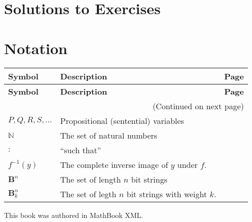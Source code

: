 \documentclass[10pt,]{book}
\theoremstyle{plain}
\theoremstyle{definition}
\theoremstyle{definition}
\theoremstyle{definition}
\numberwithin{equation}{section}
\def\N{\mathbb N}
\def\B{\mathbf{B}}
\def\inv{^{-1}}
\def\st{:}
\begin{document}
\chapter[Solutions to Exercises]{Solutions to Exercises}\label{appendix-1}
\typeout{************************************************}
\typeout{************************************************}
\chapter[Notation]{Notation}\label{appendix-2}
\begin{longtable}[l]{llr}
\textbf{Symbol}&\textbf{Description}&\textbf{Page}\\[1em]
\endfirsthead
\textbf{Symbol}&\textbf{Description}&\textbf{Page}\\[1em]
\endhead
\multicolumn{3}{r}{(Continued on next page)}\\
\endfoot
\endlastfoot
$
                    P, Q, R, S, \ldots
                $&Propositional (sentential) variables&\pageref{notation-1}\\
$\N$&The set of natural numbers&\pageref{notation-2}\\
$\st$&``such that''&\pageref{notation-3}\\
$f\inv(y)$&The complete inverse image of \(y\) under \(f\).&\pageref{notation-4}\\
$\B^n$&The set of length \(n\) bit strings&\pageref{notation-5}\\
$\B^n_k$&The set of legth \(n\) bit strings with weight \(k\).&\pageref{notation-6}\\
\end{longtable}
%
\backmatter
%
%
\printindex
%
\cleardoublepage
\pagestyle{empty}
\centerline{
    This book was authored in MathBook XML.
}
\end{document}
